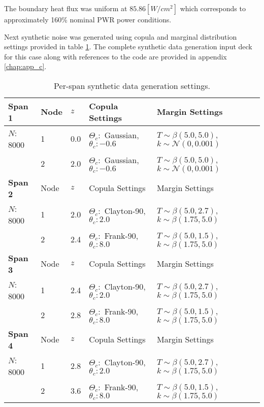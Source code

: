 The boundary heat flux was uniform at $85.86 [W/cm^2]$ which corresponds to approximately 160\% nominal PWR power conditions.

Next synthetic noise was generated using copula and marginal distribution settings provided in table \ref{tab:synth_settings}. The complete synthetic data generation input deck for this case along with references to the code are provided in appendix \ref{chap:app_c}.

\begin{table}[h]
    \begin{center}
        \caption{Per-span synthetic data generation settings.}
        \begin{tabular}{|l|l|l|l|l|}
            \hline
            \bf Span 1 & Node & $z$ & Copula Settings  & Margin Settings \\
            \hline
            $N$: 8000  & 1  & 0.0 & $\Theta_c:$ Gaussian, $\theta_c:-0.6$ &  $T\sim\beta(5.0, 5.0)$,$k\sim\mathcal{N}(0, 0.001)$ \\
                   & 2  & 2.0 & $\Theta_c:$ Gaussian, $\theta_c:-0.6$ &  $T\sim\beta(5.0, 5.0)$, $k\sim\mathcal{N}(0, 0.001)$   \\
            \hline \hline
            \bf Span 2 & Node & $z$ & Copula Settings  & Margin Settings \\
            \hline
             $N$: 8000 & 1  & 2.0 & $\Theta_c:$ Clayton-90, $\theta_c: 2.0$ &  $T\sim\beta(5.0, 2.7)$, $k\sim\beta(1.75, 5.0)$ \\
            & 2  & 2.4 & $\Theta_c:$ Frank-90, $\theta_c: 8.0$ &  $T\sim\beta(5.0, 1.5)$, $k\sim\beta(1.75, 5.0)$   \\
            \hline \hline
            \bf Span 3 & Node & $z$ & Copula Settings  & Margin Settings \\
            \hline
             $N$: 8000 & 1  & 2.4 & $\Theta_c:$ Clayton-90, $\theta_c: 2.0$ &  $T\sim\beta(5.0, 2.7)$, $k\sim\beta(1.75, 5.0)$ \\
            & 2  & 2.8 & $\Theta_c:$ Frank-90, $\theta_c: 8.0$ &  $T\sim\beta(5.0, 1.5)$, $k\sim\beta(1.75, 5.0)$   \\
            \hline \hline
            \bf Span 4 & Node & $z$ & Copula Settings  & Margin Settings \\
            \hline
            $N$: 8000 & 1  & 2.8 & $\Theta_c:$ Clayton-90, $\theta_c: 2.0$ &  $T\sim\beta(5.0, 2.7)$, $k\sim\beta(1.75, 5.0)$ \\
            & 2  & 3.6 & $\Theta_c:$ Frank-90, $\theta_c: 8.0$ &  $T\sim \beta(5.0, 1.5)$, $k\sim\beta(1.75, 5.0)$   \\
            \hline
        \end{tabular}
        \label{tab:synth_settings}
    \end{center}
\end{table}

